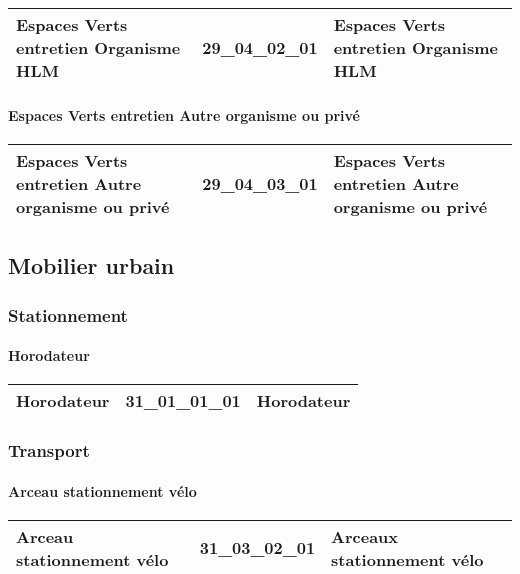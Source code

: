 \documentclass[12pt,titlepage,oneside]{book}
\begin{document}
\renewcommand{\arraystretch}{1.2}
\begin{supertabular}{|p{10cm}|c|p{15cm}|}
 Espaces Verts entretien Organisme HLM & 29\_04\_02\_01 & Espaces Verts entretien Organisme HLM\\
\hline
\end{supertabular}


\paragraph{Espaces Verts entretien Autre organisme ou privé}
\noindent
\vspace{\baselineskip}

\renewcommand{\arraystretch}{1.2}
\begin{supertabular}{|p{10cm}|c|p{15cm}|}
 Espaces Verts entretien Autre organisme ou privé & 29\_04\_03\_01 & Espaces Verts entretien Autre organisme ou privé\\
\hline
\end{supertabular}
\subsection{Mobilier urbain}
\subsubsection{\large Stationnement}
\paragraph{Horodateur}
\noindent
\vspace{\baselineskip}

\renewcommand{\arraystretch}{1.2}
\begin{supertabular}{|p{10cm}|c|p{15cm}|}
 Horodateur & 31\_01\_01\_01 & Horodateur\\
\hline
\end{supertabular}

\subsubsection{\large Transport}
\paragraph{Arceau stationnement vélo}
\noindent
\vspace{\baselineskip}

\renewcommand{\arraystretch}{1.2}
\begin{supertabular}{|p{10cm}|c|p{15cm}|}
 Arceau stationnement vélo & 31\_03\_02\_01 & Arceaux stationnement vélo\\
\hline
\end{supertabular}
\end{document}
